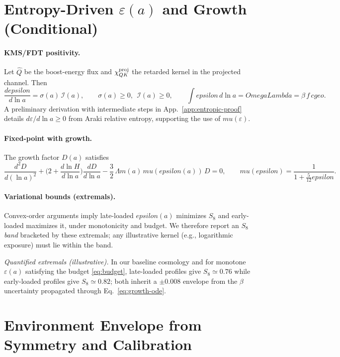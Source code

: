 \documentclass[aps,prd,onecolumn,superscriptaddress,nofootinbib]{revtex4-2}
\def\OmL{OmegaLambda}%
\def\cgeo{cgeo}%
\def\eps{epsilon}%
\def\mu{mu}%
\def\Omega_\Lambda{OmegaLambda}%
\providecommand{\OmL}{\Omega_\Lambda}
\providecommand{\cgeo}{c_{\rm geo}}
\providecommand{\eps}{\varepsilon}
\providecommand{\be}{\begin{equation}}
\providecommand{\ee}{\end{equation}}
\begin{document}
\section{Entropy-Driven \texorpdfstring{$\varepsilon(a)$}{epsilon(a)} and Growth (Conditional)}
\label{sec:epsilon}

\paragraph{KMS/FDT positivity.}
Let \(\hat Q\) be the boost-energy flux and \(\chi_{QK}^{\rm proj}\) the retarded kernel in the projected channel. Then
\be
\frac{d\eps}{d\ln a}=\sigma(a)\,\mathcal I(a),\qquad \sigma(a)\ge 0,\ \ \mathcal I(a)\ge 0,\qquad
\int \eps\,d\ln a=\OmL=\beta\,f\,\cgeo.
\ee
A preliminary derivation with intermediate steps in App.~\ref{app:entropic-proof} details \(d\varepsilon/d\ln a \ge 0\) from Araki relative entropy, supporting the use of \(\mu(\varepsilon)\).

\paragraph{Fixed-point with growth.}
The growth factor \(D(a)\) satisfies
\be
\label{eq:growth-ode}
\frac{d^2 D}{d(\ln a)^2}
+\Big(2+\frac{d\ln H}{d\ln a}\Big)\frac{dD}{d\ln a}
-\frac{3}{2}\,\Omega_m(a)\,\mu(\eps(a))\,D=0,\qquad
\mu(\eps)=\frac{1}{1+\tfrac{5}{12}\eps}.
\ee

\paragraph{Variational bounds (extremals).}
Convex-order arguments imply late-loaded \(\eps(a)\) minimizes \(S_8\) and early-loaded maximizes it, under monotonicity and budget. We therefore report an \(S_8\) \emph{band} bracketed by these extremals; any illustrative kernel (e.g., logarithmic exposure) must lie within the band.

\noindent\emph{Quantified extremals (illustrative).} In our baseline cosmology and for monotone \(\varepsilon(a)\) satisfying the budget \eqref{eq:budget}, late-loaded profiles give \(S_8\simeq 0.76\) while early-loaded profiles give \(S_8\simeq 0.82\); both inherit a \(\pm 0.008\) envelope from the \(\beta\) uncertainty propagated through Eq.~\eqref{eq:growth-ode}.

\section{Environment Envelope from Symmetry and Calibration}
\label{sec:env}
\end{document}
